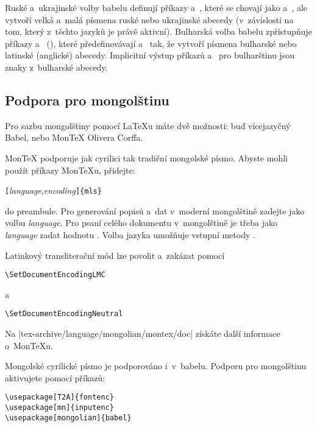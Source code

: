 Ruské a~ukrajinské volby \textsf{babelu} definují příkazy  a~, které
se chovají jako  a~, ale vytvoří velká a~malá písmena ruské nebo
ukrajinské abecedy (v~závislosti na tom, který z~těchto jazyků je právě aktivní).
Bulharská volba \textsf{babelu} zpřístupňuje příkazy  a~ (),
které předefinovávají  a~ tak, že vytvoří písmena
bulharské nebo latinské (anglické) abecedy. Implicitní výstup příkazů
 a~ pro bulharštinu jsou znaky z~bulharské abecedy.


\subsection{Podpora pro mongolštinu}

Pro sazbu mongolštiny pomocí \LaTeX u máte dvě možnosti: buď vícejazyčný Babel,
nebo Mon\TeX{} Olivera Corffa.

Mon\TeX{} podporuje jak cyrilici tak tradiční mongolské písmo. Abyste mohli použít
příkazy Mon\TeX u, přidejte:
\begin{lscommand}
\verb|[|\emph{language},\emph{encoding}\verb|]{mls}|
\end{lscommand}
\noindent do preambule. Pro generování popisů a~dat v~moderní mongolštině
zadejte  jako volbu \emph{language}. Pro psaní celého dokumentu
v~mongolštině je třeba jako \emph{language} zadat hodnotu .
Volba jazyka  umožňuje vstupní metody .

Latinkový transliterační mód lze povolit a~zakázat pomocí
\begin{lscommand}
\verb|\SetDocumentEncodingLMC|
\end{lscommand}
a~\begin{lscommand}
\verb|\SetDocumentEncodingNeutral|
\end{lscommand}

Na \CTANalt|tex-archive/language/mongolian/montex/doc| získáte další informace o~Mon\TeX u.

Mongolské cyrilické písmo je podporováno i~v~\textsf{babelu}. Podporu
pro mongolštinu aktivujete pomocí příkazů:

\begin{lscommand}
\verb|\usepackage[T2A]{fontenc}|\\
\verb|\usepackage[mn]{inputenc}|\\
\verb|\usepackage[mongolian]{babel}|
\end{lscommand}

